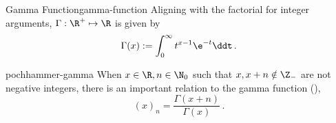 \begin{definition}{Gamma Function}{gamma-function}
  Aligning with the factorial for integer arguments, $\Gamma: \R^+ \mapsto \R$ is given by
  $$\Gamma(x) := \int_0^\infty t^{x-1}\e^{-t} \ddt\,.$$
\end{definition}

\begin{remark}{}{pochhammer-gamma}
  When $x \in \R, n \in \N_0$ such that $x, x+n \notin \Z_-$ are not negative integers, there is an important relation to the gamma function (),
  $$(x)_n = \frac{\Gamma(x+n)}{\Gamma(x)}\,.$$
\end{remark}
